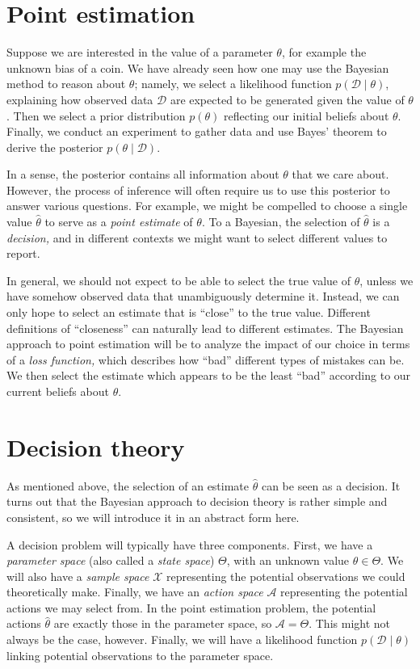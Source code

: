\documentclass{article}
\newcommand{\given}{\mid}
\newcommand{\mc}[1]{\mathcal{#1}}
\newcommand{\data}{\mc{D}}
\begin{document}
\section*{Point estimation}

Suppose we are interested in the value of a parameter $\theta$, for
example the unknown bias of a coin.  We have already seen how one may
use the Bayesian method to reason about $\theta$; namely, we select a
likelihood function $p(\data \given \theta)$, explaining how observed
data $\data$ are expected to be generated given the value of $\theta$.
Then we select a prior distribution $p(\theta)$ reflecting our initial
beliefs about $\theta$.  Finally, we conduct an experiment to gather
data and use Bayes' theorem to derive the posterior $p(\theta \given
\data)$.

In a sense, the posterior contains all information about $\theta$ that
we care about.  However, the process of inference will often require
us to use this posterior to answer various questions.  For example, we
might be compelled to choose a single value $\hat{\theta}$ to serve as
a \emph{point estimate} of $\theta$.  To a Bayesian, the selection of
$\hat{\theta}$ is a \emph{decision,} and in different contexts we
might want to select different values to report.

In general, we should not expect to be able to select the true value
of $\theta$, unless we have somehow observed data that unambiguously
determine it.  Instead, we can only hope to select an estimate that is
``close'' to the true value.  Different definitions of ``closeness''
can naturally lead to different estimates. The Bayesian approach to
point estimation will be to analyze the impact of our choice in terms
of a \emph{loss function,} which describes how ``bad'' different types
of mistakes can be.  We then select the estimate which appears to be
the least ``bad'' according to our current beliefs about $\theta$.

\section*{Decision theory}

As mentioned above, the selection of an estimate $\hat{\theta}$ can be
seen as a decision.  It turns out that the Bayesian approach to
decision theory is rather simple and consistent, so we will introduce
it in an abstract form here.

A decision problem will typically have three components.  First, we
have a \emph{parameter space} (also called a \emph{state space})
$\Theta$, with an unknown value $\theta \in \Theta$.  We will also
have a \emph{sample space} $\mc{X}$ representing the potential
observations we could theoretically make.  Finally, we have an
\emph{action space} $\mc{A}$ representing the potential actions we may
select from.  In the point estimation problem, the potential actions
$\hat{\theta}$ are exactly those in the parameter space, so $\mc{A} =
\Theta$.  This might not always be the case, however.  Finally, we
will have a likelihood function $p(\data \given \theta)$ linking
potential observations to the parameter space.
\end{document}
